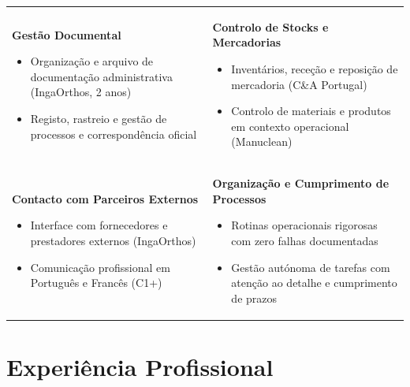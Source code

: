\documentclass[10pt,a4paper]{article}
\begin{document}
\begin{tabularx}{\textwidth}{@{}XX@{}}

\begin{minipage}[t]{\linewidth}
  {\small\bfseries\color{accent}Gestão Documental}
  \begin{itemize}\small
    \item Organização e arquivo de documentação administrativa (IngaOrthos, 2 anos)
    \item Registo, rastreio e gestão de processos e correspondência oficial
  \end{itemize}
\end{minipage}
&
\begin{minipage}[t]{\linewidth}
  {\small\bfseries\color{accent}Controlo de Stocks e Mercadorias}
  \begin{itemize}\small
    \item Inventários, receção e reposição de mercadoria (C\&A Portugal)
    \item Controlo de materiais e produtos em contexto operacional (Manuclean)
  \end{itemize}
\end{minipage}
\\[8pt]

\begin{minipage}[t]{\linewidth}
  {\small\bfseries\color{accent}Contacto com Parceiros Externos}
  \begin{itemize}\small
    \item Interface com fornecedores e prestadores externos (IngaOrthos)
    \item Comunicação profissional em Português e Francês (C1+)
  \end{itemize}
\end{minipage}
&
\begin{minipage}[t]{\linewidth}
  {\small\bfseries\color{accent}Organização e Cumprimento de Processos}
  \begin{itemize}\small
    \item Rotinas operacionais rigorosas com zero falhas documentadas
    \item Gestão autónoma de tarefas com atenção ao detalhe e cumprimento de prazos
  \end{itemize}
\end{minipage}

\end{tabularx}

\section{Experiência Profissional}
\end{document}
